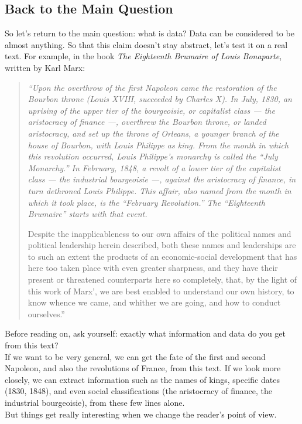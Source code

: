 \subsection{Back to the Main Question}
\label{sub:return-to-main-question}

So let's return to the main question: what is data? Data can be considered to be almost anything. So that this claim doesn't stay abstract, let's test it on a real text. For example, in the book \textit{The Eighteenth Brumaire of Louis Bonaparte}, written by Karl Marx\autocite{marx1852}:

\begin{quote}
\itshape
``Upon the overthrow of the first Napoleon came the restoration of the Bourbon throne (Louis XVIII, succeeded by Charles X). In July, 1830, an uprising of the upper tier of the bourgeoisie, or capitalist class --- the aristocracy of finance ---, overthrew the Bourbon throne, or landed aristocracy, and set up the throne of Orleans, a younger branch of the house of Bourbon, with Louis Philippe as king. From the month in which this revolution occurred, Louis Philippe's monarchy is called the ``July Monarchy.'' In February, 1848, a revolt of a lower tier of the capitalist class --- the industrial bourgeoisie ---, against the aristocracy of finance, in turn dethroned Louis Philippe. This affair, also named from the month in which it took place, is the ``February Revolution.'' The ``Eighteenth Brumaire'' starts with that event.

Despite the inapplicableness to our own affairs of the political names and political leadership herein described, both these names and leaderships are to such an extent the products of an economic-social development that has here too taken place with even greater sharpness, and they have their present or threatened counterparts here so completely, that, by the light of this work of Marx', we are best enabled to understand our own history, to know whence we came, and whither we are going, and how to conduct ourselves.''
\end{quote}
Before reading on, ask yourself: exactly what information and data do you get from this text?\\
If we want to be very general, we can get the fate of the first and second Napoleon, and also the revolutions of France, from this text. If we look more closely, we can extract information such as the names of kings, specific dates (1830, 1848), and even social classifications (the aristocracy of finance, the industrial bourgeoisie), from these few lines alone.\\
But things get really interesting when we change the reader's point of view.

